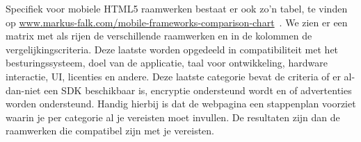 Specifiek voor mobiele HTML5 raamwerken bestaat er ook zo'n tabel,  te vinden op \url{www.markus-falk.com/mobile-frameworks-comparison-chart}~\cite{Falk2011}.  
We zien er een matrix met als rijen de verschillende raamwerken en in de kolommen de vergelijkingscriteria.  
Deze laatste worden opgedeeld in compatibiliteit met het besturingssysteem,  doel van de applicatie,  taal voor ontwikkeling,  hardware interactie,  UI,  licenties en andere.  
Deze laatste categorie bevat de criteria of er al-dan-niet een SDK beschikbaar is, encryptie ondersteund wordt en of advertenties worden ondersteund.  
Handig hierbij is dat de webpagina een stappenplan voorziet waarin je per categorie al je vereisten moet invullen.  
De resultaten zijn dan de raamwerken die compatibel zijn met je vereisten.

